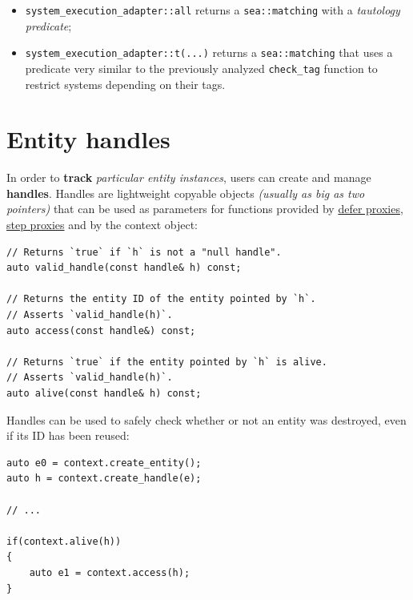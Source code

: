 \documentclass[twoside, 12pt, a4paper, openright]{book}
\begin{document}
\begin{itemize}
\item
  \texttt{system_execution_adapter::all}
  returns a
  \texttt{sea::matching}
  with a \emph{tautology predicate};
\item
  \texttt{system_execution_adapter::t(...)}
  returns a
  \texttt{sea::matching}
  that uses a predicate very similar to the previously analyzed
  \texttt{check_tag}
  function to restrict systems depending on their tags.
\end{itemize}

\section{Entity handles}\label{entity-handles}

In order to \textbf{track} \emph{particular entity instances}, users can
create and manage \textbf{handles}. Handles are lightweight copyable
objects \emph{(usually as big as two pointers)} that can be used as
parameters for functions provided by
\protect\hyperlink{proxies_defer}{defer proxies},
\protect\hyperlink{proxies_step}{step proxies} and by the context
object:

\begin{verbatim}
// Returns `true` if `h` is not a "null handle".
auto valid_handle(const handle& h) const;

// Returns the entity ID of the entity pointed by `h`.
// Asserts `valid_handle(h)`.
auto access(const handle&) const;

// Returns `true` if the entity pointed by `h` is alive.
// Asserts `valid_handle(h)`.
auto alive(const handle& h) const;
\end{verbatim}

Handles can be used to safely check whether or not an entity was
destroyed, even if its ID has been reused:

\begin{verbatim}
auto e0 = context.create_entity();
auto h = context.create_handle(e);

// ...

if(context.alive(h))
{
    auto e1 = context.access(h);
}
\end{verbatim}
\end{document}
